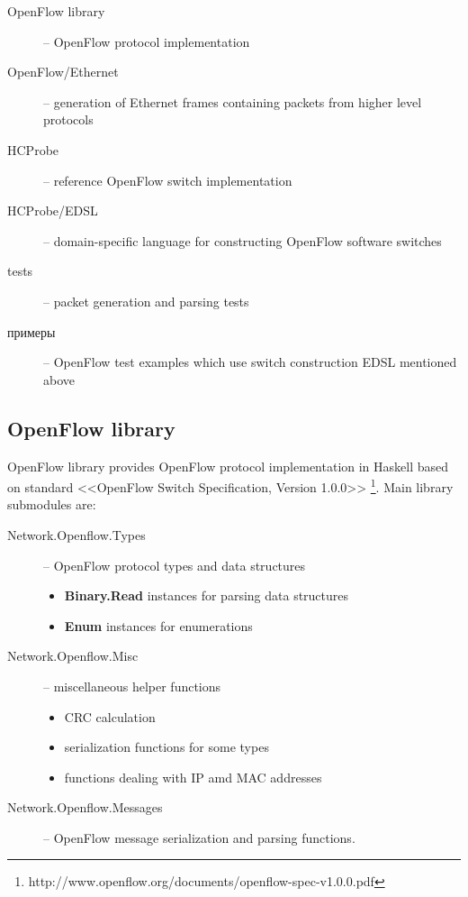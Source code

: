 \documentclass[9pt,a4paper]{article}
\begin{document}
\begin{description}
    \item[OpenFlow library] -- OpenFlow protocol implementation
    \item[OpenFlow/Ethernet] -- generation of Ethernet frames
      containing packets from higher level protocols
    \item[HCProbe] -- reference OpenFlow switch implementation
    \item[HCProbe/EDSL] -- domain-specific language for constructing
      OpenFlow software switches
    \item[tests] -- packet generation and parsing tests
    \item[примеры] -- OpenFlow test examples which use switch
      construction EDSL mentioned above
\end{description}


\subsection{OpenFlow library}

OpenFlow library provides OpenFlow protocol implementation in Haskell
based on standard <<OpenFlow Switch Specification, Version 1.0.0>>
\footnote{http://www.openflow.org/documents/openflow-spec-v1.0.0.pdf}.
Main library submodules are:

\begin{description}
    \item[Network.Openflow.Types] -- OpenFlow protocol types and data
      structures
        \begin{itemize}
            \item \textbf{Binary.Read} instances for parsing data
              structures
            \item \textbf{Enum} instances for enumerations
        \end{itemize}
    \item[Network.Openflow.Misc] -- miscellaneous helper functions
        \begin{itemize}
            \item CRC calculation
            \item serialization functions for some types
            \item functions dealing with IP amd MAC addresses
        \end{itemize}
    \item[Network.Openflow.Messages] -- OpenFlow message
      serialization and parsing functions.
\end{description}
\end{document}
